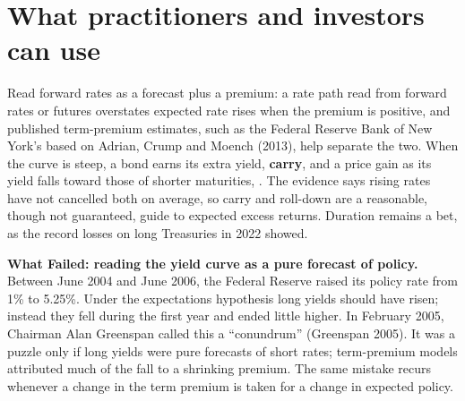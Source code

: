 \section{What practitioners and investors can use}
\label{sec:07-investors}

Read forward rates as a forecast plus a premium: a rate path read from forward rates or futures overstates expected rate rises when the premium is positive, and published term-premium estimates, such as the Federal Reserve Bank of New York's based on Adrian, Crump and Moench (2013), help separate the two. When the curve is steep, a bond earns its extra yield, \textbf{carry}, and a price gain as its yield falls toward those of shorter maturities, . The evidence says rising rates have not cancelled both on average, so carry and roll-down are a reasonable, though not guaranteed, guide to expected excess returns. Duration remains a bet, as the record losses on long Treasuries in 2022 showed.

\begin{callout}
\textbf{What Failed: reading the yield curve as a pure forecast of policy.} Between June 2004 and June 2006, the Federal Reserve raised its policy rate from 1\% to 5.25\%. Under the expectations hypothesis long yields should have risen; instead they fell during the first year and ended little higher. In February 2005, Chairman Alan Greenspan called this a ``conundrum'' (Greenspan 2005). It was a puzzle only if long yields were pure forecasts of short rates; term-premium models attributed much of the fall to a shrinking premium. The same mistake recurs whenever a change in the term premium is taken for a change in expected policy.
\end{callout}

\makeatletter
{}
\makeatother

